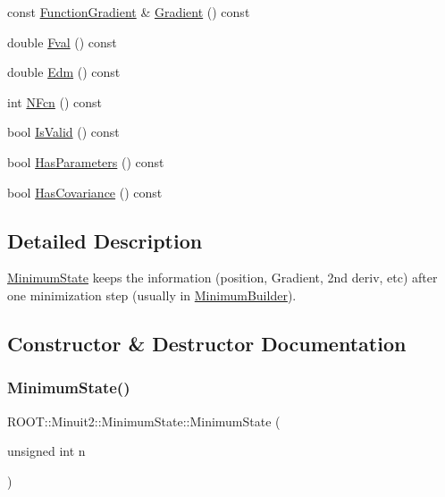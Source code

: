 \begin{DoxyCompactItemize}
\item 
const \mbox{\hyperlink{classROOT_1_1Minuit2_1_1FunctionGradient}{Function\+Gradient}} \& \mbox{\hyperlink{classROOT_1_1Minuit2_1_1MinimumState_a08a0d667e1f89522a29c49c9c02e642d}{Gradient}} () const
\item 
double \mbox{\hyperlink{classROOT_1_1Minuit2_1_1MinimumState_aad936fc04cd24c5b769748b93ded0ab9}{Fval}} () const
\item 
double \mbox{\hyperlink{classROOT_1_1Minuit2_1_1MinimumState_a397315b170efca9446f7d6a91bae6c59}{Edm}} () const
\item 
int \mbox{\hyperlink{classROOT_1_1Minuit2_1_1MinimumState_aedc2a07bcaf49ef63ac092a867463731}{N\+Fcn}} () const
\item 
bool \mbox{\hyperlink{classROOT_1_1Minuit2_1_1MinimumState_ae8bab1ba76b2d6597c79224e966da5f5}{Is\+Valid}} () const
\item 
bool \mbox{\hyperlink{classROOT_1_1Minuit2_1_1MinimumState_a5871d5838abf68982d9e2ed7a66ea5c3}{Has\+Parameters}} () const
\item 
bool \mbox{\hyperlink{classROOT_1_1Minuit2_1_1MinimumState_aba1e55d52217a591657dba0cc9fa8c9c}{Has\+Covariance}} () const
\end{DoxyCompactItemize}


\subsection{Detailed Description}
\mbox{\hyperlink{classROOT_1_1Minuit2_1_1MinimumState}{Minimum\+State}} keeps the information (position, Gradient, 2nd deriv, etc) after one minimization step (usually in \mbox{\hyperlink{classROOT_1_1Minuit2_1_1MinimumBuilder}{Minimum\+Builder}}). 

\subsection{Constructor \& Destructor Documentation}
\mbox{\label{classROOT_1_1Minuit2_1_1MinimumState_a47a98082c74eff4dc1fc1758078c27d6}} 
\subsubsection{\texorpdfstring{MinimumState()}{MinimumState()}\hspace{0.1cm}{\footnotesize\ttfamily [1/12]}}
{\footnotesize\ttfamily R\+O\+O\+T\+::\+Minuit2\+::\+Minimum\+State\+::\+Minimum\+State (\begin{DoxyParamCaption}\item[{unsigned int}]{n }\end{DoxyParamCaption})\hspace{0.3cm}{\ttfamily [inline]}}

